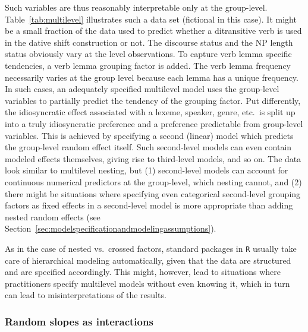 \documentclass[a4paper,12pt]{article}
\begin{document}
Such variables are thus reasonably interpretable only at the group-level.
Table~\ref{tab:multilevel} illustrates such a data set (fictional in this case).
It might be a small fraction of the data used to predict whether a ditransitive verb is used in the dative shift construction or not.
The discourse status and the NP length status obviously vary at the level observations.
To capture verb lemma specific tendencies, a verb lemma grouping factor is added.
The verb lemma frequency necessarily varies at the group level because each lemma has a unique frequency.
In such cases, an adequately specified multilevel model uses the group-level variables to partially predict the tendency of the grouping factor.
Put differently, the idiosyncratic effect associated with a lexeme, speaker, genre, etc.\ is split up into a truly idiosyncratic preference and a preference predictable from group-level variables.
This is achieved by specifying a second (linear) model which predicts the group-level random effect itself.
Such second-level models can even contain modeled effects themselves, giving rise to third-level models, and so on.
The data look similar to multilevel nesting, but (1) second-level models can account for continuous numerical predictors at the group-level, which nesting cannot, and (2) there might be situations where specifying even categorical second-level grouping factors as fixed effects in a second-level model is more appropriate than adding nested random effects (see Section~\ref{sec:modelspecificationandmodelingassumptions}).

As in the case of nested vs.\ crossed factors, standard packages in \texttt{R} usually take care of hierarchical modeling automatically, given that the data are structured and are specified accordingly.
This might, however, lead to situations where practitioners specify multilevel models without even knowing it, which in turn can lead to misinterpretations of the results.

\subsubsection{Random slopes as interactions}
\label{sec:randominterceptsandslopes}
\end{document}
